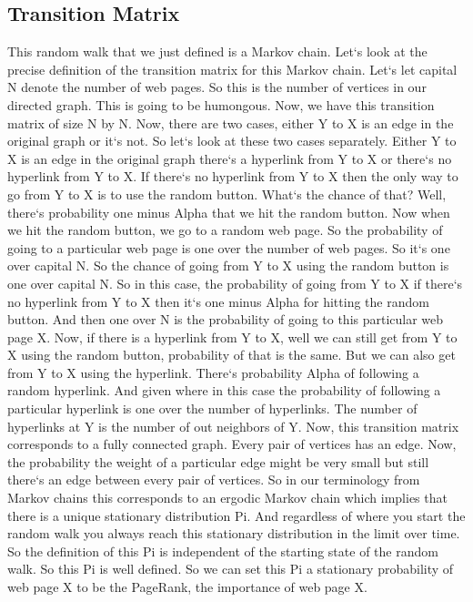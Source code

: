 \subsection{Transition Matrix}
This random walk that we just defined is a Markov chain.
Let`s look at the precise definition of the transition matrix for this Markov chain.
Let`s let capital N denote the number of web pages.
So this is the number of vertices in our directed graph.
This is going to be humongous.
Now, we have this transition matrix of size N by N\@.
Now, there are two cases, either Y to X is an edge in the original graph or it`s not.
So let`s look at these two cases separately.
Either Y to X is an edge in the original graph there`s a hyperlink from Y to X or there`s no hyperlink from Y to X\@.
If there`s no hyperlink from Y to X then the only way to go from Y to X is to use the random button.
What`s the chance of that? Well, there`s probability one minus Alpha that we hit the random button.
Now when we hit the random button, we go to a random web page.
So the probability of going to a particular web page is one over the number of web pages.
So it`s one over capital N\@.
So the chance of going from Y to X using the random button is one over capital N\@.
So in this case, the probability of going from Y to X if there`s no hyperlink from Y to X then it`s one minus Alpha for hitting the random button.
And then one over N is the probability of going to this particular web page X\@.
Now, if there is a hyperlink from Y to X, well we can still get from Y to X using the random button, probability of that is the same.
But we can also get from Y to X using the hyperlink.
There`s probability Alpha of following a random hyperlink.
And given where in this case the probability of following a particular hyperlink is one over the number of hyperlinks.
The number of hyperlinks at Y is the number of out neighbors of Y\@.
Now, this transition matrix corresponds to a fully connected graph.
Every pair of vertices has an edge.
Now, the probability the weight of a particular edge might be very small but still there`s an edge between every pair of vertices.
So in our terminology from Markov chains this corresponds to an ergodic Markov chain which implies that there is a unique stationary distribution Pi.
And regardless of where you start the random walk you always reach this stationary distribution in the limit over time.
So the definition of this Pi is independent of the starting state of the random walk.
So this Pi is well defined.
So we can set this Pi a stationary probability of web page X to be the PageRank, the importance of web page X\@.

